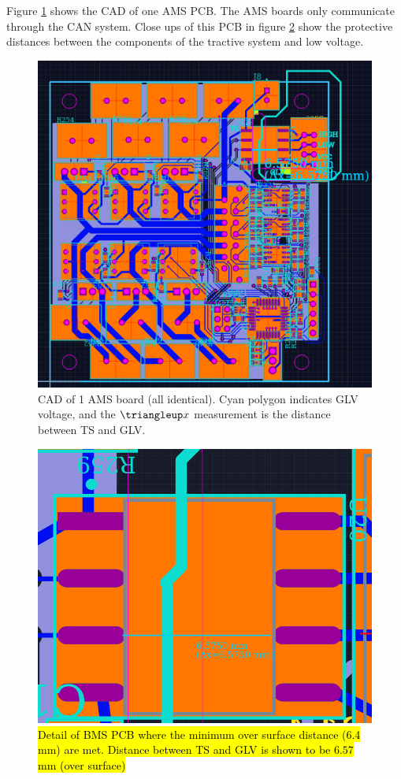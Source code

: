 \documentclass{article}
\DeclareRobustCommand{\hlr}[1]{{\sethlcolor{red}\hl{#1}}}
\begin{document}

            Figure \ref{bmspcb} shows the CAD of one AMS PCB. The AMS boards only communicate through the CAN system. Close ups of this PCB in figure \ref{creepage} show the protective distances between the components of the tractive system and low voltage.

            \begin{figure}[H]
                \centering
                \includegraphics[width = 0.7 \textwidth]{bms_final1_PCBCAD}
                \caption{CAD of 1 AMS board (all identical). Cyan polygon indicates GLV voltage, and the $\triangleup x$ measurement is the distance between TS and GLV.}
                \label{bmspcb}
            \end{figure}


            \begin{figure}[H]
                \centering
                \includegraphics[width=0.4 \textwidth]{bms_separation_detail}
                \caption{\hlr{Detail of BMS PCB where the minimum over surface distance (6.4 mm) are met. Distance between TS and GLV is shown to be $6.57$ mm (over surface)}}
                \label{creepage}
            \end{figure}
\end{document}
